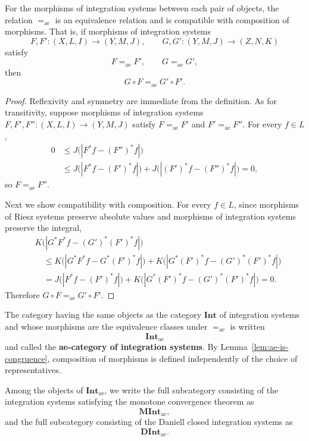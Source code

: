 \begin{lemma}\label{lem:ae-is-congruence}
  For the morphisms of integration systems between each pair of objects, the
  relation $=_{\mathrm{ae}}$ is an equivalence relation and is compatible with
  composition of morphisms.
  That is, if morphisms of integration systems
  \[
    F,F':(X,L,I)\to(Y,M,J),
    \qquad
    G,G':(Y,M,J)\to(Z,N,K)
  \]
  satisfy
  \[
    F=_{\mathrm{ae}}F',
    \qquad
    G=_{\mathrm{ae}}G' ,
  \]
  then
  \[
    G\circ F=_{\mathrm{ae}}G'\circ F' .
  \]
\end{lemma}
\begin{proof}
  Reflexivity and symmetry are immediate from the definition. As for
  transitivity, suppose morphisms of integration systems
  $F,F',F'':(X,L,I)\to(Y,M,J)$ satisfy $F=_{\mathrm{ae}}F'$ and
  $F'=_{\mathrm{ae}}F''$. For every $f\in L$,
  \[
    \begin{aligned}
      0
      &\le J\bigl(|F^*f-(F'')^*f|\bigr)\\
      &\le J\bigl(|F^*f-(F')^*f|\bigr)
        +J\bigl(|(F')^*f-(F'')^*f|\bigr)
      =0 ,
    \end{aligned}
  \]
  so $F=_{\mathrm{ae}}F''$.

  Next we show compatibility with composition. For every $f\in L$, since
  morphisms of Riesz systems preserve absolute values and morphisms of
  integration systems preserve the integral,
  \[
    \begin{aligned}
      &K\bigl(|G^*F^*f-(G')^*(F')^*f|\bigr)\\
      &\quad\le
      K\bigl(|G^*F^*f-G^*(F')^*f|\bigr)
      +K\bigl(|G^*(F')^*f-(G')^*(F')^*f|\bigr)\\
      &\quad=
      J\bigl(|F^*f-(F')^*f|\bigr)
      +K\bigl(|G^*(F')^*f-(G')^*(F')^*f|\bigr)
      =0.
    \end{aligned}
  \]
  Therefore $G\circ F=_{\mathrm{ae}}G'\circ F'$.
\end{proof}

\begin{definition}\label{def:int-ae}
  The category having the same objects as the category $\mathbf{Int}$ of
  integration systems and whose morphisms are the equivalence classes under
  $=_{\mathrm{ae}}$ is written
  \[
    \mathbf{Int}_{\mathrm{ae}}
  \]
  and called the \textbf{ae-category of integration systems}.
  By Lemma~\ref{lem:ae-is-congruence}, composition of morphisms is defined
  independently of the choice of representatives.

  Among the objects of $\mathbf{Int}_{\mathrm{ae}}$, we write the full
  subcategory consisting of the integration systems satisfying the monotone
  convergence theorem as
  \[
    \mathbf{MInt}_{\mathrm{ae}},
  \]
  and the full subcategory consisting of the Daniell closed integration systems
  as
  \[
    \mathbf{DInt}_{\mathrm{ae}} .
  \]
\end{definition}
